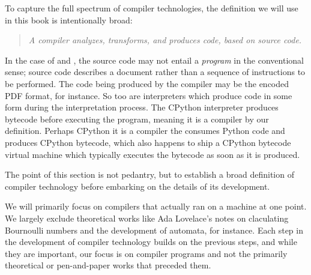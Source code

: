 \vspace{0.5em}

To capture the full spectrum of compiler technologies,
the definition we will use in this book is intentionally broad:
\begin{quotation}
\textit{
    A compiler analyzes, transforms, and produces code, based on source code.
}
\end{quotation}

In the case of \tex and \metafont, the source code
may not entail a \textit{program} in the conventional sense;
\tex source code describes a document rather than a sequence of
instructions to be performed.
The code being produced by the compiler may be the encoded PDF format, for instance.
So too are interpreters which produce code in some form during the interpretation process.
The CPython interpreter produces bytecode before executing the program,
meaning it is a compiler by our definition.
Perhaps CPython it is a compiler the consumes Python code and produces CPython bytecode,
which also happens to ship a CPython bytecode virtual machine which typically
executes the bytecode as soon as it is produced.

The point of this section is not pedantry, but to establish a broad definition of
compiler technology before embarking on the details of its development.

We will primarily focus on compilers that actually ran on a machine at one point.
We largely exclude theoretical works like Ada Lovelace's notes on claculating Bournoulli numbers
and the development of automata, for instance.
Each step in the development of compiler technology builds on the previous steps,
and while they are important, our focus is on compiler programs and not the
primarily theoretical or pen-and-paper works that preceded them.
